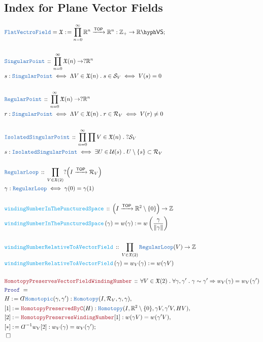 \documentclass[12pt]{scrartcl}
\newcommand{\TYPE}[1]{\textcolor{NavyBlue}{\mathtt{#1}}}
\newcommand{\FUNC}[1]{\textcolor{Cerulean}{\mathtt{#1}}}
\newcommand{\LOGIC}[1]{\textcolor{Blue}{\mathtt{#1}}}
\newcommand{\THM}[1]{\textcolor{Maroon}{\mathtt{#1}}}
\renewcommand{\.}{\; . \;}
\newcommand{\de}{: \kern 0.1pc =}
\newcommand{\Act}[1]{\left( #1 \right)}
\newcommand{\Theorem}[2]{& \THM{#1} \, :: \, #2 \\ & \Proof = \\ }
\newcommand{\DeclareType}[2]{& \TYPE{#1} \, :: \, #2 \\}
\newcommand{\DefineType}[3]{& #1 : \TYPE{#2} \iff #3 \\}
\newcommand{\DefineNamedType}[4]{& #1 : \TYPE{#2} \iff #3 \iff #4 \\}
\newcommand{\DeclareFunc}[2]{& \FUNC{#1} \, :: \, #2 \\}
\newcommand{\DefineNamedFunc}[4]{&  \FUNC{#1}\Act{#2} = #3 \de #4 \\}
\newcommand{\Page}[1]{ \begin{align*} #1 \end{align*}   }
\newcommand{ \bd }{ \ByDef }
\newcommand{\Imply}{\Rightarrow}
\newcommand{\Int}{\mathbb{Z} }
\newcommand{\Reals}{\mathbb{R} }
\newcommand{\Arrow}{\xrightarrow}
\newcommand{\Say}[3]{& #1 \de #2 : #3, \\}
\newcommand{\Conclude}[3]{& #1 \de #2 : #3; \\}
\newcommand{\QED}{\; \square}
\newcommand{\EndProof}{& \QED \\}
\newcommand{\ByDef}{\rotatebox[origin=c]{-180}{$D$}}%
\newcommand{\Proof}{\LOGIC{Proof} \; }
\newcommand{\TOP}{\mathsf{TOP}}
\newcommand{\U}{\mathcal{U}}
\newcommand{\VS}[1]{#1\hyph\mathsf{VS}} %
\newcommand{\VF}{\mathfrak{X}}
\begin{document}
\subsection{Index for Plane Vector Fields}
\Page{
	\Conclude{\TYPE{FlatVectroField} = \mathfrak{X}}{ \prod^\infty_{n=0} \Reals^n \Arrow{\TOP} \Reals^n }{\Int_+ \to \VS{\Reals} }
	\\
	\DeclareType{SingularPoint}{\prod_{n=0}^\infty \VF(n) \to ?\Reals^n}
	\DefineNamedType{s}{SingularPoint}{\Lambda V \in \VF(n) \. s \in \mathcal{S}_V}{V(s) = 0}
	\\
	\DeclareType{RegularPoint}{\prod_{n=0}^\infty \VF(n) \to ?\Reals^n}
	\DefineNamedType{r}{SingularPoint}{\Lambda V \in \VF(n) \. r \in \mathcal{R}_V}{V(r) \neq  0}
	\\
	\DeclareType{IsolatedSingularPoint}{\prod_{n=0}^\infty \prod V \in  \VF(n) \. ?\mathcal{S}_V}
	\DefineType{s}{IsolatedSingularPoint}{\exists U \in \U(s) \. U \setminus \{s\} \subset \mathcal{R}_V}
	\\
	\DeclareType{RegularLoop}{\prod_{V \in \VF(2)} ?\Big(I \Arrow{\TOP} \mathcal{R}_V\Big) }
	\DefineType{\gamma}{RegularLoop}{\gamma(0) = \gamma(1)}
	\\
	\DeclareFunc{windingNumberInThePuncturedSpace}{\Big(I \Arrow{\TOP} \Reals^2 \setminus\{0\}\Big) \to \Int}
	\DefineNamedFunc{windingNumberInThePuncturedSpace}{\gamma}{w(\gamma)}{w\left( \frac{\gamma}{\| \gamma \|}\right)}	
	\\
	\DeclareFunc{windingNumberRelativeToAVectorField}{\prod_{V \in \VF(2)} \TYPE{RegularLoop}(V) \to \Int}
	\DefineNamedFunc{windingNumberRelativeToAVectorField}{\gamma}{w_V(\gamma)}{w(\gamma V)} 
	\\
	\Theorem{HomotopyPreservesVectorFieldWindingNumber}{
		\forall V \in \VF(2) \. 
		\forall \gamma,\gamma' \.
		\gamma \sim \gamma' \Imply w_V(\gamma) = w_V(\gamma')
	}
	\Say{H}{\bd \TYPE{Homotopic}(\gamma,\gamma')}{\TYPE{Homotopy}(I,\mathcal{R}_V,\gamma,\gamma)}
	\Say{[1]}{\THM{HomotopyPreservedByC}(H)}{\TYPE{Homotopy}(I,\Reals^2 \setminus \{0\},\gamma V,\gamma' V, H V)}
	\Say{[2]}{\THM{HomotopyPreservesWindingNumber}[1]}{ w( \gamma V) = w( \gamma' V )  }
	\Conclude{[*]}{\bd^{-1} w_V [2]}{w_V(\gamma) = w_V(\gamma')}
	\EndProof
}
\end{document}
